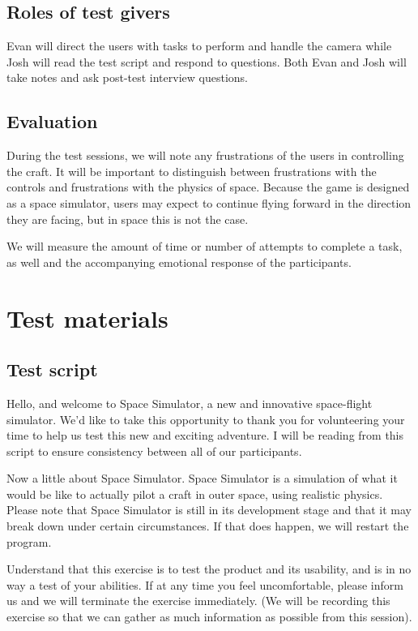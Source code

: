 \subsection{Roles of test givers}

Evan will direct the users with tasks to perform and handle the camera while Josh will read the test script and respond to questions.  Both Evan and Josh will take notes and ask post-test interview questions.

\subsection{Evaluation}

During the test sessions, we will note any frustrations of the users in controlling the craft.  It will be important to distinguish between frustrations with the controls and frustrations with the physics of space.  Because the game is designed as a space simulator, users may expect to continue flying forward in the direction they are facing, but in space this is not the case.

We will measure the amount of time or number of attempts to complete a task, as well and the accompanying emotional response of the participants.

\section{Test materials}

\subsection{Test script}

Hello, and welcome to Space Simulator, a new and innovative space-flight simulator.  We'd like to take this opportunity to thank you for volunteering your time to help us test this new and exciting adventure.  I will be reading from this script to ensure consistency between all of our participants.

Now a little about Space Simulator.  Space Simulator is a simulation of what it would be like to actually pilot a craft in outer space, using realistic physics.  Please note that Space Simulator is still in its development stage and that it may break down under certain circumstances.  If that does happen, we will restart the program. 
  
Understand that this exercise is to test the product and its usability, and is in no way a test of your abilities.  If at any time you feel uncomfortable, please inform us and we will terminate the exercise immediately. (We will be recording this exercise so that we can gather as much information as possible from this session).
   
